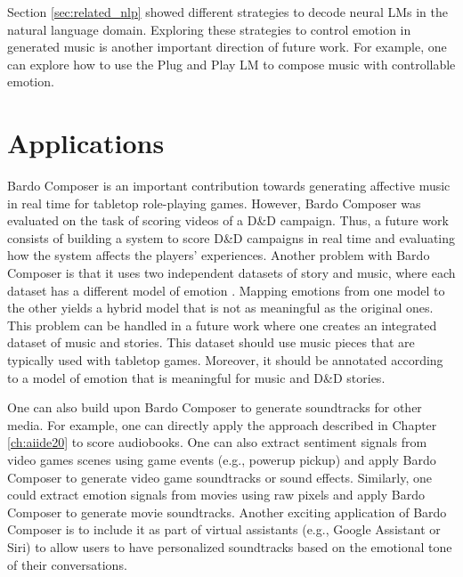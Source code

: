 Section \ref{sec:related_nlp} showed different strategies to decode neural LMs in the natural language domain. Exploring these strategies to control emotion in generated music is another important direction of future work. For example, one can explore how to use the Plug and Play LM \cite{dathathri2019plug} to compose music with controllable emotion.

\section{Applications}

Bardo Composer is an important contribution towards generating affective music in real time for tabletop role-playing games. However, Bardo Composer was evaluated on the task of scoring videos of a D\&D campaign. Thus, a future work consists of building a system to score D\&D campaigns in real time and evaluating how the system affects the players' experiences. Another problem with Bardo Composer is that it uses two independent datasets of story and music, where each dataset has a different model of emotion \cite{padovani2017}. Mapping emotions from one model to the other yields a hybrid model that is not as meaningful as the original ones. This problem can be handled in a future work where one creates an integrated dataset of music and stories. This dataset should use music pieces that are typically used with tabletop games. Moreover, it should be annotated according to a model of emotion that is meaningful for music and D\&D stories.

One can also build upon Bardo Composer to generate soundtracks for other media. For example, one can directly apply the approach described in Chapter \ref{ch:aiide20} to score audiobooks. One can also extract sentiment signals from video games scenes using game events (e.g., powerup pickup) and apply Bardo Composer to generate video game soundtracks or sound effects. Similarly, one could extract emotion signals from movies using raw pixels and apply Bardo Composer to generate movie soundtracks. Another exciting application of Bardo Composer is to include it as part of virtual assistants (e.g., Google Assistant or Siri) to allow users to have personalized soundtracks based on the emotional tone of their conversations.
